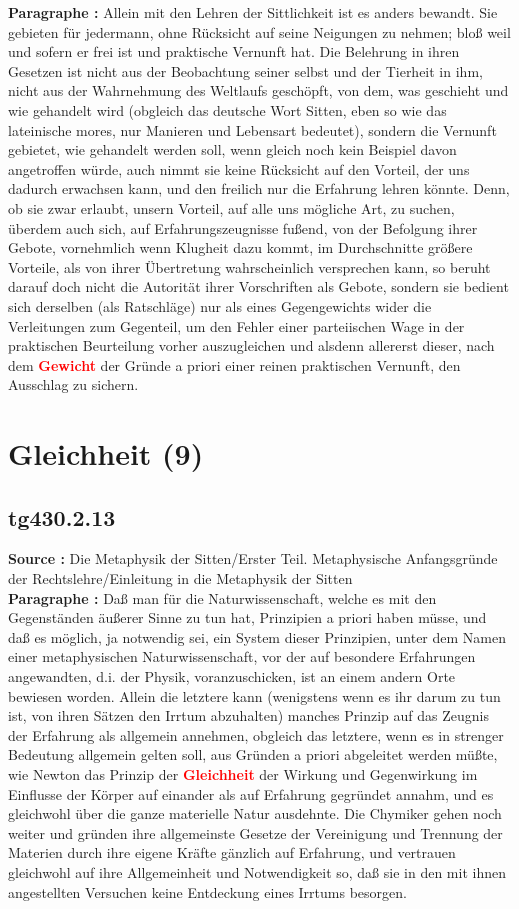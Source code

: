 \documentclass[a4paper,12pt,twoside]{book}
\newcommand{\match}[1]{\textcolor{red}{\textbf{#1}}}
\newcommand{\unnumberedsection}[1]{
	\section*{#1}
	\addcontentsline{toc}{section}{#1}
	\markright{#1}
}
\begin{document}
	\textbf{Paragraphe : }Allein mit den Lehren der Sittlichkeit ist es anders bewandt. Sie gebieten für jedermann, ohne Rücksicht auf seine Neigungen zu nehmen; bloß weil und sofern er frei ist und praktische Vernunft hat. Die Belehrung in ihren Gesetzen ist nicht aus der Beobachtung seiner selbst und der Tierheit in ihm, nicht aus der Wahrnehmung des Weltlaufs geschöpft,  von dem, was geschieht und wie gehandelt wird (obgleich das deutsche Wort Sitten, eben so wie das lateinische mores, nur Manieren und Lebensart bedeutet), sondern die Vernunft gebietet, wie gehandelt werden soll, wenn gleich noch kein Beispiel davon angetroffen würde, auch nimmt sie keine Rücksicht auf den Vorteil, der uns dadurch erwachsen kann, und den freilich nur die Erfahrung lehren könnte. Denn, ob sie zwar erlaubt, unsern Vorteil, auf alle uns mögliche Art, zu suchen, überdem auch sich, auf Erfahrungszeugnisse fußend, von der Befolgung ihrer Gebote, vornehmlich wenn Klugheit dazu kommt, im Durchschnitte größere Vorteile, als von ihrer Übertretung wahrscheinlich versprechen kann, so beruht darauf doch nicht die Autorität ihrer Vorschriften als Gebote, sondern sie bedient sich derselben (als Ratschläge) nur als eines Gegengewichts wider die Verleitungen zum Gegenteil, um den Fehler einer parteiischen Wage in der praktischen Beurteilung vorher auszugleichen und alsdenn allererst dieser, nach dem \match{Gewicht} der Gründe a priori einer reinen praktischen Vernunft, den Ausschlag zu sichern. 
	
	\unnumberedsection{Gleichheit (9)} 
	\subsection*{tg430.2.13} 
	\textbf{Source : }Die Metaphysik der Sitten/Erster Teil. Metaphysische Anfangsgründe der Rechtslehre/Einleitung in die Metaphysik der Sitten\\  
	
	\textbf{Paragraphe : }Daß man für die Naturwissenschaft, welche es mit den Gegenständen äußerer Sinne zu tun hat, Prinzipien a priori haben müsse, und daß es möglich, ja notwendig sei, ein System dieser Prinzipien, unter dem Namen einer metaphysischen Naturwissenschaft, vor der auf besondere Erfahrungen angewandten, d.i. der Physik, voranzuschicken, ist an einem andern Orte bewiesen worden. Allein die letztere kann (wenigstens wenn es ihr darum zu tun ist, von ihren Sätzen den Irrtum abzuhalten) manches Prinzip auf das Zeugnis der Erfahrung als allgemein annehmen, obgleich das letztere, wenn es in strenger Bedeutung allgemein gelten soll, aus Gründen a priori abgeleitet werden müßte, wie Newton das Prinzip der \match{Gleichheit} der Wirkung und Gegenwirkung im Einflusse der Körper auf einander als auf Erfahrung gegründet annahm, und es gleichwohl über die ganze materielle Natur ausdehnte. Die Chymiker gehen noch weiter und gründen ihre allgemeinste Gesetze der Vereinigung und Trennung der Materien durch ihre eigene Kräfte gänzlich auf Erfahrung, und vertrauen gleichwohl auf ihre Allgemeinheit und Notwendigkeit so, daß sie in den mit ihnen angestellten Versuchen keine Entdeckung eines Irrtums besorgen. 
	
\end{document}

